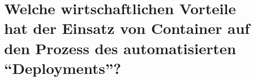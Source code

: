 \chapter{Welche wirtschaftlichen Vorteile hat der Einsatz von Container auf den Prozess des automatisierten \enquote{Deployments}?} \label{ff2}